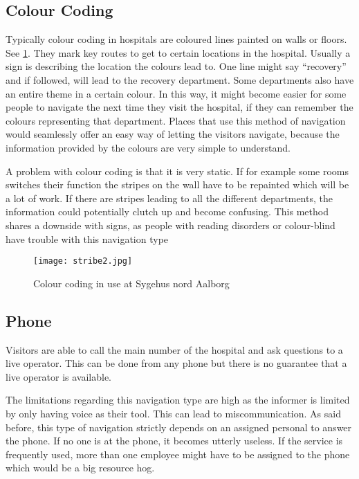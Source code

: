 \subsection{Colour Coding}\label{sub:col}
Typically colour coding in hospitals are coloured lines painted on walls or floors. See \cref{fig:colour_floor}. They mark key routes to get to certain locations in the hospital. Usually a sign is describing the location the colours lead to. One line might say \enquote{recovery} and if followed, will lead to the recovery department. Some departments also have an entire theme in a certain colour. In this way, it might become easier for some people to navigate the next time they visit the hospital, if they can remember the colours representing that department.
Places that use this method of navigation would seamlessly offer an easy way of letting the visitors navigate, because the information provided by the colours are very simple to understand.

A problem with colour coding is that it is very static. If for example some rooms switches their function the stripes on the wall have to be repainted which will be a lot of work. If there are stripes leading to all the different departments, the information could potentially clutch up and become confusing. This method shares a downside with signs, as people with reading disorders or colour-blind have trouble with this navigation type

\begin{figure}[htb]
  \begin{center} 
    \texttt{[image: stribe2.jpg]}
  \end{center}
  \caption{Colour coding in use at Sygehus nord Aalborg}
  \label{fig:colour_floor}
\end{figure}

\subsection{Phone}\label{sub:pho}
Visitors are able to call the main number of the hospital and ask questions to a live operator. This can be done from any phone but there is no guarantee that a live operator is available. \cite{sign_ring}
 
The limitations regarding this navigation type are high as the informer is limited by only having voice as their tool. This can lead to  miscommunication. As said before, this type of navigation strictly depends on an assigned personal to answer the phone. If no one is at the phone, it becomes utterly useless.
If the service is frequently used, more than one employee might have to be assigned to the phone which would be a big resource hog.

